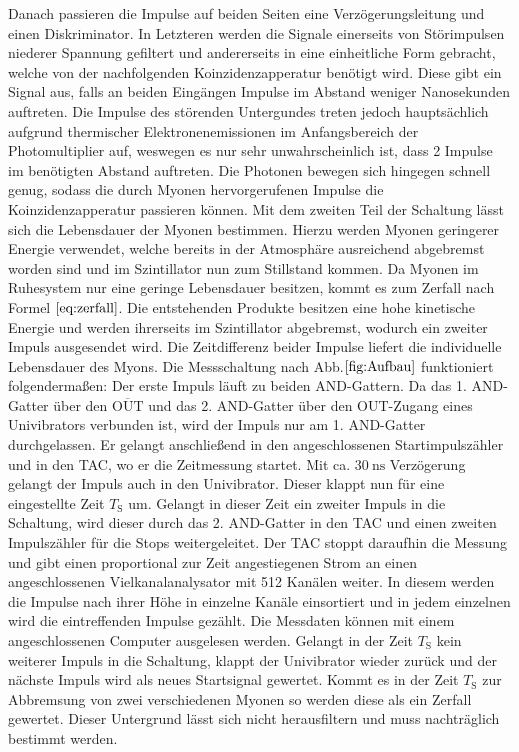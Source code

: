    Danach passieren die Impulse auf beiden Seiten eine Verzögerungsleitung und einen Diskriminator. In Letzteren werden die Signale einerseits von Störimpulsen niederer Spannung gefiltert und andererseits in eine einheitliche Form gebracht, welche von der nachfolgenden Koinzidenzapperatur benötigt wird.
     Diese gibt ein Signal aus, falls an beiden Eingängen Impulse im Abstand weniger Nanosekunden auftreten. Die Impulse des störenden Untergundes treten jedoch hauptsächlich aufgrund thermischer Elektronenemissionen im Anfangsbereich der Photomultiplier auf, weswegen es nur sehr unwahrscheinlich ist, dass 2 Impulse im benötigten Abstand auftreten. Die Photonen bewegen sich hingegen schnell genug, sodass die durch Myonen hervorgerufenen Impulse die Koinzidenzapperatur passieren können.
    Mit dem zweiten Teil der Schaltung lässt sich die Lebensdauer der Myonen bestimmen. Hierzu werden Myonen geringerer Energie verwendet, welche bereits in der Atmosphäre ausreichend abgebremst worden sind und im Szintillator nun zum Stillstand kommen.
    Da Myonen im Ruhesystem nur eine geringe Lebensdauer besitzen, kommt es zum Zerfall nach Formel $\eqref{eq:zerfall}$. Die entstehenden Produkte besitzen eine hohe kinetische Energie und werden ihrerseits im Szintillator abgebremst, wodurch ein zweiter Impuls ausgesendet wird. Die Zeitdifferenz beider Impulse liefert die individuelle Lebensdauer des Myons. Die Messschaltung nach Abb.$ \ref{fig:Aufbau}$ funktioniert folgendermaßen:
    Der erste Impuls läuft zu beiden AND-Gattern. Da das 1. AND-Gatter über den $\overline{\text{OUT}}$  und das 2. AND-Gatter über den OUT-Zugang eines Univibrators verbunden ist, wird der Impuls nur am 1. AND-Gatter durchgelassen. Er gelangt anschließend in den angeschlossenen Startimpulszähler und in den TAC, wo er die Zeitmessung startet. Mit ca. $\SI{30}{\nano\second}$ Verzögerung gelangt der Impuls auch in den Univibrator. Dieser klappt nun für eine eingestellte Zeit $T_\text{S}$ um. Gelangt in dieser Zeit ein zweiter Impuls in die Schaltung, wird dieser durch das 2. AND-Gatter in den TAC und einen zweiten Impulszähler für die Stops weitergeleitet. Der TAC stoppt daraufhin die Messung und gibt einen proportional zur Zeit angestiegenen Strom an einen angeschlossenen Vielkanalanalysator mit 512 Kanälen weiter. In diesem werden die Impulse nach ihrer Höhe in einzelne Kanäle einsortiert und in jedem einzelnen wird die eintreffenden Impulse gezählt. Die Messdaten können mit einem angeschlossenen Computer ausgelesen werden. Gelangt in der Zeit $T_\text{S}$ kein weiterer Impuls in die Schaltung, klappt der Univibrator wieder zurück und der nächste Impuls wird als neues Startsignal gewertet. Kommt es in der Zeit $T_\text{S}$ zur Abbremsung von zwei verschiedenen Myonen so werden diese als ein Zerfall gewertet. Dieser Untergrund lässt sich nicht herausfiltern und muss nachträglich bestimmt werden.